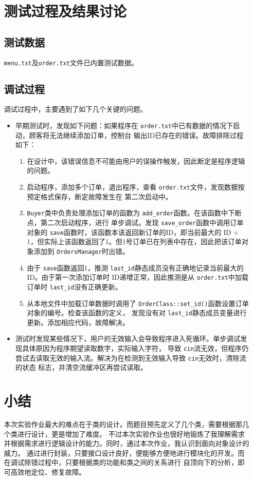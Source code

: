 \documentclass[adobefonts,a4paper]{ctexart}
\begin{document}
\section{测试过程及结果讨论}
\subsection{测试数据}
\verb|menu.txt|及\verb|order.txt|文件已内置测试数据。

\subsection{调试过程}
调试过程中，主要遇到了如下几个关键的问题。

\begin{itemize}
 \item 早期测试时，发现如下问题：如果程序在 \verb|order.txt|中已有数据的情况下启动，顾客将无法继续添加订单，控制台
 输出ID已存在的错误。故障排除过程如下：
 \begin{enumerate}
  \item 在设计中，该错误信息不可能由用户的误操作触发，因此断定是程序逻辑的问题。
  \item 启动程序，添加多个订单，退出程序，查看 \verb|order.txt|文件，发现数据按预定格式保存，断定故障发生在
  第二次启动中。
  \item \verb|Buyer|类中负责处理添加订单的函数为 \verb|add_order|函数。在该函数中下断点，第二次启动程序，进行
  单步调试。发现 \verb|save_order|函数中调用订单对象的 \verb|save|函数时，该函数本该返回新订单的ID，即当前最大的
  ID + 1，但实际上该函数返回了1。但1号订单已在列表中存在，因此把该订单对象添加到 \verb|OrdersManager|时出错。
  \item 由于 \verb|save|函数返回1，推测 \verb|last_id|静态成员没有正确地记录当前最大的ID。由于第一次添加订单时
  ID递增正常，因此推测是从 \verb|order.txt|中加载订单时 \verb|last_id|没有正确更新。
  \item 从本地文件中加载订单数据时调用了 \verb|OrderClass::set_id()|函数设置订单对象的编号。检查该函数的定义，
  发现没有对 \verb|last_id|静态成员变量进行更新。添加相应代码，故障解决。
 \end{enumerate}
 
 \item 测试时发现某些情况下，用户的无效输入会导致程序进入死循环。单步调试发现具体原因为程序期望读取数字，实际输入字符，
 导致 \verb|cin|流无效，但程序仍尝试去读取无效的输入流。解决为在检测到无效输入导致 \verb|cin|无效时，清除流的状态
 标志，并清空流缓冲区再尝试读取。
 
\end{itemize}


\section{小结}
本次实验作业最大的难点在于类的设计。而题目预先定义了几个类，需要根据那几个类进行设计，更是增加了难度。
不过本次实验作业也很好地锻炼了我理解需求并根据需求进行逻辑设计的能力。同时，通过本次作业，我认识到面向对象设计的威力。
通过进行封装，只要接口设计良好，便能够方便地进行模块化的开发。而在调试除错过程中，只要根据类的功能和类之间的关系进行
自顶向下的分析，即可高效地定位、修复故障。
\end{document}

